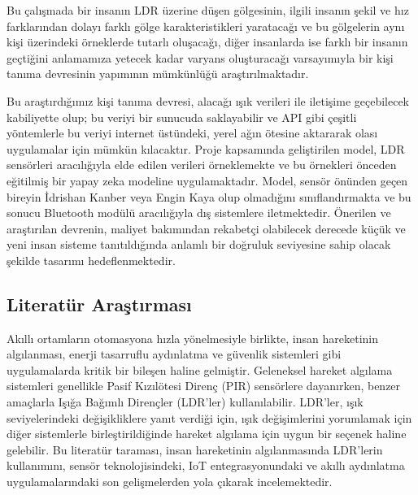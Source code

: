 Bu çalışmada bir insanın LDR üzerine düşen gölgesinin, ilgili insanın şekil ve hız farklarından dolayı farklı gölge karakteristikleri yaratacağı ve bu gölgelerin aynı kişi üzerindeki örneklerde tutarlı oluşacağı, diğer insanlarda ise farklı bir insanın geçtiğini anlamamıza yetecek kadar varyans oluşturacağı varsayımıyla bir kişi tanıma devresinin yapımının mümkünlüğü araştırılmaktadır.

Bu araştırdığımız kişi tanıma devresi, alacağı ışık verileri ile iletişime geçebilecek kabiliyette olup; bu veriyi bir sunucuda saklayabilir ve API gibi çeşitli yöntemlerle bu veriyi internet üstündeki, yerel ağın ötesine aktararak olası uygulamalar için mümkün kılacaktır. Proje kapsamında geliştirilen model, LDR sensörleri aracılığıyla elde edilen verileri örneklemekte ve bu örnekleri önceden eğitilmiş bir yapay zeka modeline uygulamaktadır. Model, sensör önünden geçen bireyin İdrishan Kanber veya Engin Kaya olup olmadığını sınıflandırmakta ve bu sonucu Bluetooth modülü aracılığıyla dış sistemlere iletmektedir. Önerilen ve araştırılan devrenin, maliyet bakımından rekabetçi olabilecek derecede küçük ve yeni insan sisteme tanıtıldığında anlamlı bir doğruluk seviyesine sahip olacak şekilde tasarımı hedeflenmektedir.

\subsection{Literatür Araştırması}

\begin{comment}
Bu konuda başkaları tarafından yapılmış benzer araştırma, çalışma ve
uygulamalar hakkında kaynak gösterilerek bilgi verilir.

\begin{itemize}
\item
  \begin{quote}
  Bu \emph{bölümde IEEE Xplore Digital library}, TÜBİTAK Turkish Journal
  of Electrical Engineering \& Computer Sciences, YÖK Tez Kütüphanesi,
  Uluslararası veya ulusal hakemli dersgiler ve KTÜ Tez Kütüphanesindeki
  yayınlarından olmak üzere en az 5 yayına atıfta bulunulması
  zorunludur. Bu atıflardan en az 2 tanesi İngilizce olmalıdır.
  \end{quote}
\end{itemize}
\end{comment}


Akıllı ortamların otomasyona hızla yönelmesiyle birlikte, insan hareketinin algılanması, enerji tasarruflu aydınlatma ve güvenlik sistemleri gibi uygulamalarda kritik bir bileşen haline gelmiştir. Geleneksel hareket algılama sistemleri genellikle Pasif Kızılötesi Direnç (PIR) sensörlere dayanırken, benzer amaçlarla Işığa Bağımlı Dirençler (LDR'ler) kullanılabilir. LDR’ler, ışık seviyelerindeki değişikliklere yanıt verdiği için, ışık değişimlerini yorumlamak için diğer sistemlerle birleştirildiğinde hareket algılama için uygun bir seçenek haline gelebilir. Bu literatür taraması, insan hareketinin algılanmasında LDR'lerin kullanımını, sensör teknolojisindeki, IoT entegrasyonundaki ve akıllı aydınlatma uygulamalarındaki son gelişmelerden yola çıkarak incelemektedir.

